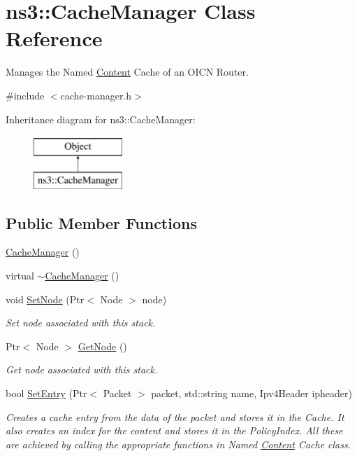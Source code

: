 \hypertarget{classns3_1_1CacheManager}{\section{ns3\-:\-:Cache\-Manager Class Reference}
\label{classns3_1_1CacheManager}
}


Manages the Named \hyperlink{classns3_1_1Content}{Content} Cache of an O\-I\-C\-N Router.  




{\ttfamily \#include $<$cache-\/manager.\-h$>$}

Inheritance diagram for ns3\-:\-:Cache\-Manager\-:\begin{figure}[H]
\begin{center}
\leavevmode
\includegraphics[height=2.000000cm]{classns3_1_1CacheManager}
\end{center}
\end{figure}
\subsection*{Public Member Functions}
\begin{DoxyCompactItemize}
\item 
\hyperlink{classns3_1_1CacheManager_a48853b4bb253bcc6c41c9185f8c81169}{Cache\-Manager} ()
\item 
virtual \hyperlink{classns3_1_1CacheManager_a6c35578ef0c60fc2395a813d5c26c395}{$\sim$\-Cache\-Manager} ()
\item 
void \hyperlink{classns3_1_1CacheManager_a154c3d0f83d4ad2cf3960017f5e26577}{Set\-Node} (Ptr$<$ Node $>$ node)
\begin{DoxyCompactList}\small\item\em Set node associated with this stack. \end{DoxyCompactList}\item 
Ptr$<$ Node $>$ \hyperlink{classns3_1_1CacheManager_a124af97c5ed58b4df52f0f9db827c6ab}{Get\-Node} ()
\begin{DoxyCompactList}\small\item\em Get node associated with this stack. \end{DoxyCompactList}\item 
bool \hyperlink{classns3_1_1CacheManager_ac07096eecd5c92c16ff0e68b1a9acf0b}{Set\-Entry} (Ptr$<$ Packet $>$ packet, std\-::string name, Ipv4\-Header ipheader)
\begin{DoxyCompactList}\small\item\em Creates a cache entry from the data of the packet and stores it in the Cache. It also creates an index for the content and stores it in the Policy\-Index. All these are achieved by calling the appropriate functions in Named \hyperlink{classns3_1_1Content}{Content} Cache class. \end{DoxyCompactList}\end{DoxyCompactItemize}
